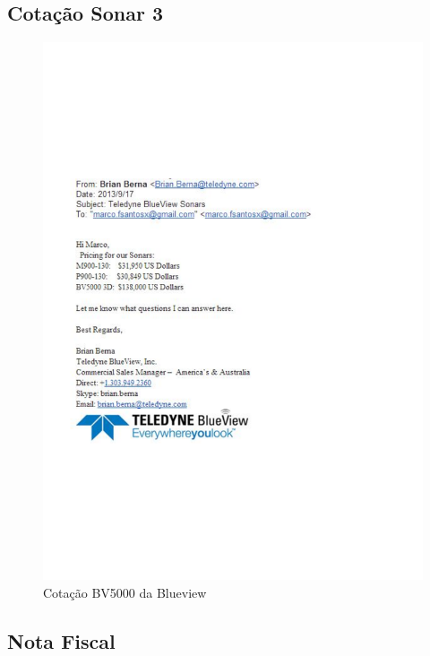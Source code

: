\subsection{Cotação Sonar 3 }
\begin{figure}[H]
 \centering
 \includegraphics[width=1\columnwidth]{Seaking_profiler/price_quote_2.pdf}
 \caption{Cotação BV5000 da Blueview}
\end{figure}

\subsection{Nota Fiscal}



